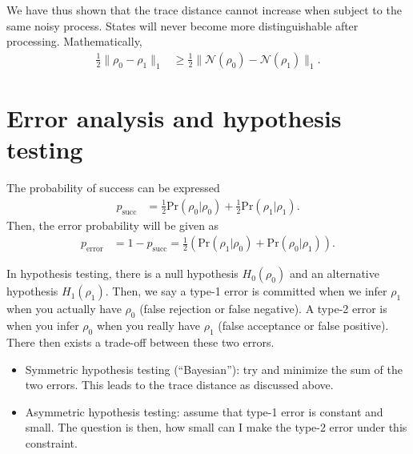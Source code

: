 \documentclass[notoc]{tufte-book}
\begin{document}
We have thus shown that the trace distance cannot increase when subject to the same noisy process. States will never become more distinguishable after processing. Mathematically, 
\begin{align}\label{eq:trace-distance-data-processing}
    \frac{1}{2} \|\rho_0 - \rho_1\|_1 &\geq \frac{1}{2} \|\mathcal{N}(\rho_0)-\mathcal{N}(\rho_1)\|_1. 
\end{align}

\section{Error analysis and hypothesis testing}
The probability of success can be expressed
\begin{align}
    p_{\text{succ}} &= \frac{1}{2} \text{Pr}(\rho_0 | \rho_0) +\frac{1}{2} \text{Pr}(\rho_1 | \rho_1).
\end{align}
Then, the error probability will be given as 
\begin{align}
    p_{\text{error}} &= 1- p_{\text{succ}} = \frac{1}{2} \left(\text{Pr}(\rho_1|\rho_0)+\text{Pr}(\rho_0|\rho_1)\right).
\end{align}

In hypothesis testing, there is a null hypothesis $H_0 (\rho_0)$ and an alternative hypothesis $H_1 (\rho_1)$. Then, we say a type-1 error is committed when we infer $\rho_1$ when you actually have $\rho_0$ (false rejection or false negative). A type-2 error is when you infer $\rho_0$ when you really have $\rho_1$ (false acceptance or false positive). There then exists a trade-off between these two errors. 
\begin{itemize}
    \item Symmetric hypothesis testing (``Bayesian''): try and minimize the sum of the two errors. This leads to the trace distance as discussed above.
    \item Asymmetric hypothesis testing: assume that type-1 error is constant and small. The question is then, how small can I make the type-2 error under this constraint.
\end{itemize}
\end{document}
